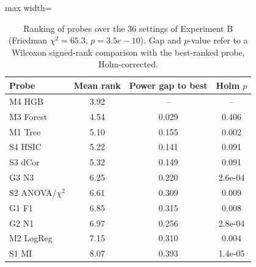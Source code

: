 \begin{table}[!t]
\centering
\caption{Ranking of probes over the 36 settings of Experiment B (Friedman $\chi^2=65.3$, $p=3.5e-10$). Gap and $p$-value refer to a Wilcoxon signed-rank comparison with the best-ranked probe, Holm-corrected.}
\label{tab:ranks}
\footnotesize
\begin{adjustbox}{max width=\linewidth}
\begin{tabular}{lccc}
\hline
Probe & Mean rank & Power gap to best & Holm $p$ \\ \hline
M4 HGB & 3.92 & -- & -- \\
M3 Forest & 4.54 & 0.029 & 0.406 \\
M1 Tree & 5.10 & 0.155 & 0.002 \\
S4 HSIC & 5.22 & 0.141 & 0.091 \\
S3 dCor & 5.32 & 0.149 & 0.091 \\
G3 N3 & 6.25 & 0.220 & 2.6e-04 \\
S2 ANOVA/$\chi^2$ & 6.61 & 0.309 & 0.009 \\
G1 F1 & 6.85 & 0.315 & 0.008 \\
G2 N1 & 6.97 & 0.256 & 2.8e-04 \\
M2 LogReg & 7.15 & 0.310 & 0.004 \\
S1 MI & 8.07 & 0.393 & 1.4e-05 \\
\hline
\end{tabular}
\end{adjustbox}
\end{table}
